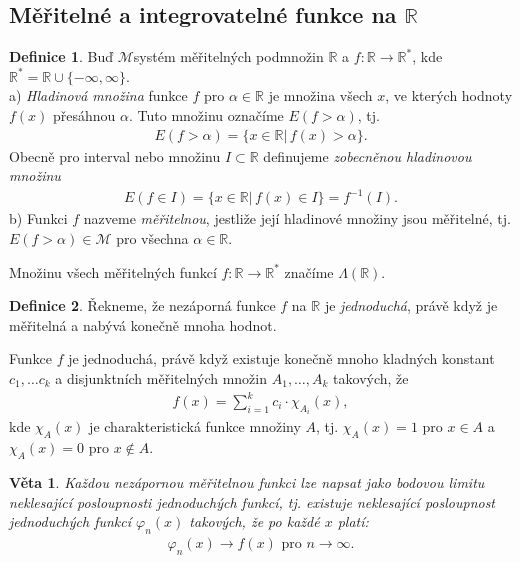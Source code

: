 \documentclass[a4]{report}
\newtheorem{theorem}{Věta}
\theoremstyle{definition}
\newtheorem{definition}{Definice}[section]
\begin{document}
{\subsection{Měřitelné a integrovatelné funkce na $\mathbb{R}$}
\begin{definition}
Buď $\mathscr{M}$systém měřitelných podmnožin $\mathbb{R}$ a $f:\mathbb{R}\rightarrow \mathbb{R}^*$, kde $\mathbb{R}^*=\mathbb{R}\cup\{-\infty,\infty\}$.\\
a) \textit{Hladinová množina} funkce $f$ pro $\alpha\in \mathbb{R}$ je množina všech $x$, ve kterých hodnoty $f(x)$ přesáhnou $\alpha$. Tuto množinu označíme $E(f>\alpha)$, tj.
\begin{align*}
E(f>\alpha)=\{x\in \mathbb{R}|\,f(x)>\alpha\}.
\end{align*} 
Obecně pro interval nebo množinu $I\subset\mathbb{R}$ definujeme \textit{zobecněnou hladinovou množinu}
\begin{align*}
E(f\in I)=\{x\in \mathbb{R}|\,f(x)\in I\}=f^{-1}(I).
\end{align*}
b) Funkci $f$ nazveme \textit{měřitelnou}, jestliže její hladinové množiny jsou měřitelné, tj. $E(f>\alpha)\in \mathscr{M}$ pro všechna $\alpha\in \mathbb{R}$.
\end{definition}
Množinu všech měřitelných funkcí $f:\mathbb{R}\rightarrow\mathbb{R}^*$ značíme $\Lambda(\mathbb{R}).$
\begin{definition}
Řekneme, že nezáporná funkce $f$ na $\mathbb{R}$ je \textit{jednoduchá}, právě když je měřitelná a nabývá konečně mnoha hodnot. 
\end{definition}
Funkce $f$ je jednoduchá, právě když existuje konečně mnoho kladných konstant $c_1,\ldots c_k$ a disjunktních měřitelných množin $A_1,\ldots,A_k$ takových, že 
\begin{align*}
f(x)=\sum_{i=1}^k c_i\cdot \chi_{A_i}(x),
\end{align*}
kde $\chi_{A}(x)$ je charakteristická funkce množiny $A$, tj. $\chi_{A}(x)=1$ pro $x\in A$ a $\chi_{A}(x)=0$ pro $x\notin A$.
\begin{theorem}
Každou nezápornou měřitelnou funkci lze napsat jako bodovou limitu neklesající posloupnosti jednoduchých funkcí, tj. existuje neklesající posloupnost jednoduchých funkcí $\varphi_n(x)$ takových, že po každé $x$ platí:
\begin{align*}
\varphi_n(x)\rightarrow f(x) \text{ pro } n\rightarrow\infty.
\end{align*}
\end{theorem}
}
\end{document}
